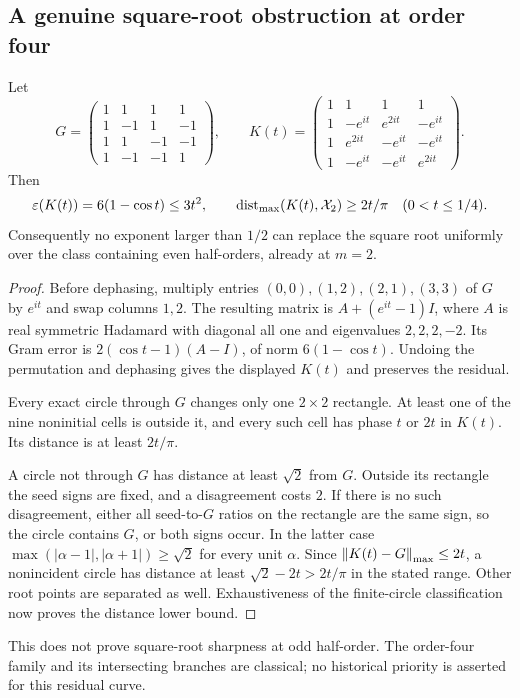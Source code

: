 \subsection{A genuine square-root obstruction at order four}
\begin{proposition}\label{prop:orderfour}
Let
\[
 G=\begin{pmatrix}1&1&1&1\\1&-1&1&-1\\1&1&-1&-1\\1&-1&-1&1\end{pmatrix},\qquad
 K(t)=\begin{pmatrix}
 1&1&1&1\\1&-e^{it}&e^{2it}&-e^{it}\\
 1&e^{2it}&-e^{it}&-e^{it}\\1&-e^{it}&-e^{it}&e^{2it}
 \end{pmatrix}.
\]
Then
\[
 \varepsilon(K(t))=6(1-\cos t)\le3t^2,
 \qquad \operatorname{dist}_{\mathrm{max}}(K(t),\mathcal X_2)\ge2t/\pi\quad(0<t\le1/4).
\]
Consequently no exponent larger than $1/2$ can replace the square root uniformly over the class containing even half-orders, already at $m=2$.
\end{proposition}
\begin{proof}
Before dephasing, multiply entries $(0,0),(1,2),(2,1),(3,3)$ of $G$ by $e^{it}$ and swap columns $1,2$. The resulting matrix is $A+(e^{it}-1)I$, where $A$ is real symmetric Hadamard with diagonal all one and eigenvalues $2,2,2,-2$. Its Gram error is $2(\cos t-1)(A-I)$, of norm $6(1-\cos t)$. Undoing the permutation and dephasing gives the displayed $K(t)$ and preserves the residual.

Every exact circle through $G$ changes only one $2\times2$ rectangle. At least one of the nine noninitial cells is outside it, and every such cell has phase $t$ or $2t$ in $K(t)$. Its distance is at least $2t/\pi$.

A circle not through $G$ has distance at least $\sqrt2$ from $G$. Outside its rectangle the seed signs are fixed, and a disagreement costs $2$. If there is no such disagreement, either all seed-to-$G$ ratios on the rectangle are the same sign, so the circle contains $G$, or both signs occur. In the latter case $\max(|\alpha-1|,|\alpha+1|)\ge\sqrt2$ for every unit $\alpha$. Since $\left\lVert K(t)-G\right\rVert_{\mathrm{max}}\le2t$, a nonincident circle has distance at least $\sqrt2-2t>2t/\pi$ in the stated range. Other root points are separated as well. Exhaustiveness of the finite-circle classification now proves the distance lower bound.
\end{proof}
This does not prove square-root sharpness at odd half-order. The order-four family and its intersecting branches are classical; no historical priority is asserted for this residual curve.

